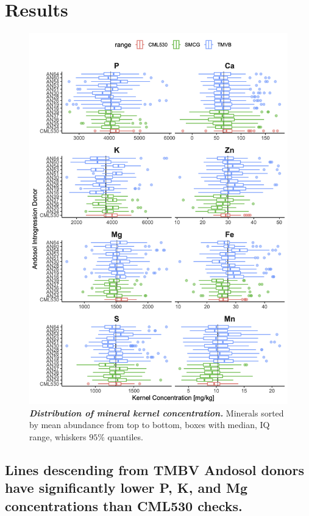 \section{Results}

\begin{figure}[!ht]
\centering
\includegraphics[width=0.8\linewidth]{Chapter-4/figs/mineral_distro.png}
\caption[Distribution of mineral kernel concentration]
{\textit{\textbf{Distribution of mineral kernel concentration.}} Minerals sorted by mean abundance from top to bottom, boxes with median, IQ range, whiskers $95\%$ quantiles. 
}
\label{fig:mineraldistro}
\end{figure}
\clearpage


\subsection{Lines descending from TMBV Andosol donors have significantly lower P, K, and Mg concentrations than CML530 checks.}


